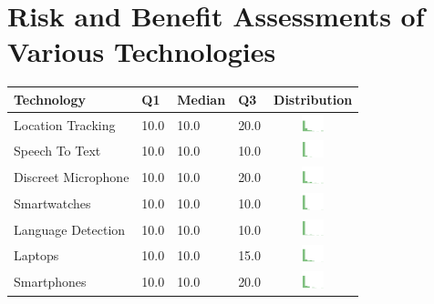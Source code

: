 \onecolumn
\section{Risk and Benefit Assessments of Various Technologies}
\label{sec:riskben-appendix} 
\twocolumn
\begin{table}[t]
\begin{center}
\small
\begin{tabular}{| p{2.6cm} | p{.8cm} | p{.8cm} | p{.8cm} | c |}
\hline
Technology & Q1 &  Median & Q3 & Distribution  \\ 
\hline
Location Tracking & 10.0 & 10.0 & 20.0 & \includegraphics[width = 2cm, height = 0.5cm]{tex-inputs/table-images/locationtrackingrisk} \\ 
Speech To Text & 10.0 & 10.0 & 10.0 & \includegraphics[width = 2cm, height = 0.5cm]{tex-inputs/table-images/speechtotextrisk} \\ 
Discreet Microphone & 10.0 & 10.0 & 20.0 & \includegraphics[width = 2cm, height = 0.5cm]{tex-inputs/table-images/discreetmicrophonerisk} \\ 
Smartwatches & 10.0 & 10.0 & 10.0 & \includegraphics[width = 2cm, height = 0.5cm]{tex-inputs/table-images/smartwatchesrisk} \\ 
Language Detection & 10.0 & 10.0 & 10.0 & \includegraphics[width = 2cm, height = 0.5cm]{tex-inputs/table-images/languagedetectionrisk} \\ 
Laptops & 10.0 & 10.0 & 15.0 & \includegraphics[width = 2cm, height = 0.5cm]{tex-inputs/table-images/laptopsrisk} \\ 
Smartphones & 10.0 & 10.0 & 20.0 & \includegraphics[width = 2cm, height = 0.5cm]{tex-inputs/table-images/smartphonesrisk} \\ 

\end{tabular}
\end{center}
\end{table}
